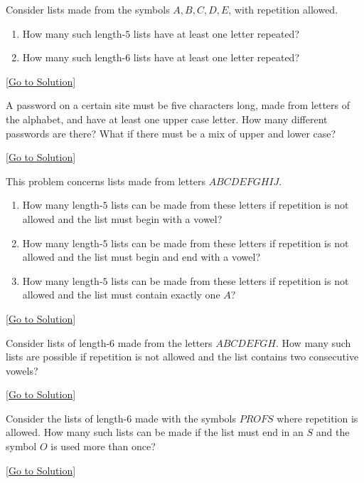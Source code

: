 \begin{exercise}\label{ex:2.24.6}
    Consider lists made from the symbols $A,B,C,D,E$, with repetition allowed. 
    \begin{enumerate}
        \item How many such length-$5$ lists have at least one letter repeated? 
        \item How many such length-$6$ lists have at least one letter repeated?
    \end{enumerate}
\end{exercise}\hyperref[sol:2.24.6]{[Go to Solution]}

\begin{exercise}\label{ex:2.24.7}
    A password on a certain site must be five characters long, made from letters of the alphabet, and have at least one upper case letter. How many different passwords are there? What if there must be a mix of upper and lower case? 
\end{exercise}\hyperref[sol:2.24.7]{[Go to Solution]}

\begin{exercise}\label{ex:2.24.8}
    This problem concerns lists made from letters $ABCDEFGHIJ$.
    \begin{enumerate}
        \item How many length-$5$ lists can be made from these letters if repetition is not allowed and the list must begin with a vowel? 
        \item How many length-$5$ lists can be made from these letters if repetition is not allowed and the list must begin and end with a vowel? 
        \item How many length-$5$ lists can be made from these letters if repetition is not allowed and the list must contain exactly one $A$? 
    \end{enumerate}
\end{exercise}\hyperref[sol:2.24.8]{[Go to Solution]}

\begin{exercise}\label{ex:2.24.9}
    Consider lists of length-$6$ made from the letters $ABCDEFGH$. How many such lists are possible if repetition is not allowed and the list contains two consecutive vowels? 
\end{exercise}\hyperref[sol:2.24.9]{[Go to Solution]}

\begin{exercise}\label{ex:2.24.10}
    Consider the lists of length-$6$ made with the symbols $PROFS$ where repetition is allowed. How many such lists can be made if the list must end in an $S$ and the symbol $O$ is used more than once? 
\end{exercise}\hyperref[sol:2.24.10]{[Go to Solution]}


